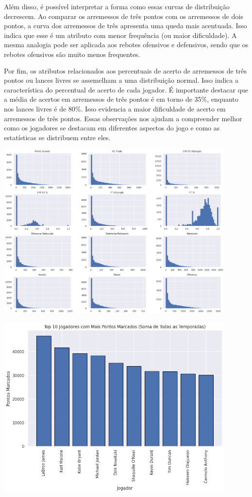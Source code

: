 \documentclass[
]{book}
\begin{document}
Além disso, é possível interpretar a forma como essas curvas de distribuição decrescem. Ao comparar os arremessos de três pontos com os arremessos de dois pontos, a curva dos arremessos de três apresenta uma queda mais acentuada. Isso indica que esse é um atributo com menor frequência (ou maior dificuldade). A mesma analogia pode ser aplicada aos rebotes ofensivos e defensivos, sendo que os rebotes ofensivos são muito menos frequentes.

Por fim, os atributos relacionados aos percentuais de acerto de arremessos de três pontos ou lances livres se assemelham a uma distribuição normal. Isso indica a característica do percentual de acerto de cada jogador. É importante destacar que a média de acertos em arremessos de três pontos é em torno de 35\%, enquanto nos lances livres é de 80\%. Isso evidencia a maior dificuldade de acerto em arremessos de três pontos. Essas observações nos ajudam a compreender melhor como os jogadores se destacam em diferentes aspectos do jogo e como as estatísticas se distribuem entre eles.

\includegraphics[width=0.9\textwidth,height=\textheight]{imagens/15.png}

\includegraphics[width=0.9\textwidth,height=\textheight]{imagens/16.png}
\end{document}
